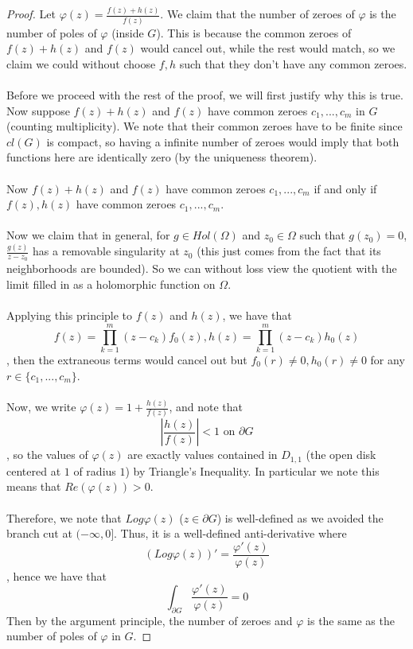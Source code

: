 \begin{proof}
Let $\varphi(z) = \frac{f(z) + h(z)}{f(z)}$. We claim that the number of zeroes of $\varphi$ is the number of poles of $\varphi$ (inside $G$). This is because the common zeroes of $f(z) + h(z)$ and $f(z)$ would cancel out, while the rest would match, so we claim we could without choose $f, h$ such that they don't have any common zeroes.\\\\
Before we proceed with the rest of the proof, we will first justify why this is true. 
Now suppose $f(z) + h(z)$ and $f(z)$ have common zeroes $c_1, ..., c_m$ in $G$ (counting multiplicity). We note that their common zeroes have to be finite since $cl(G)$ is compact, so having a infinite number of zeroes would imply that both functions here are identically zero (by the uniqueness theorem).\\\\
Now $f(z) + h(z)$ and $f(z)$ have common zeroes $c_1, ..., c_m$ if and only if $f(z), h(z)$ have common zeroes $c_1, ..., c_m$.\\\\
Now we claim that in general, for $g \in Hol(\Omega)$ and $z_0 \in \Omega$ such that $g(z_0) = 0$, $\frac{g(z)}{z - z_0}$ has a removable singularity at $z_0$ (this just comes from the fact that its neighborhoods are bounded). So we can without loss view the quotient with the limit filled in as a holomorphic function on $\Omega$.\\\\
Applying this principle to $f(z)$ and $h(z)$, we have that
\[f(z) = \prod_{k = 1}^m (z - c_k) f_0(z), h(z) = \prod_{k = 1}^m (z - c_k) h_0(z)\]
, then the extraneous terms would cancel out but $f_0(r) \neq 0, h_0(r) \neq 0$ for any $r \in \{c_1, ..., c_m\}$.\\\\
Now, we write $\varphi(z) = 1 + \frac{h(z)}{f(z)}$, and note that
\[|\frac{h(z)}{f(z)}| < 1 \text{ on $\partial G$}\]
, so the values of $\varphi(z)$ are exactly values contained in $D_{1, 1}$ (the open disk centered at $1$ of radius $1$) by Triangle's Inequality. In particular we note this means that $Re(\varphi(z)) > 0$.\\\\
Therefore, we note that $Log \varphi(z)$ ($z \in \partial G$) is well-defined as we avoided the branch cut at $(-\infty, 0]$. Thus, it is a well-defined anti-derivative where
\[(Log \varphi(z))' = \frac{\varphi'(z)}{\varphi(z)}\]
, hence we have that
\[\int_{\partial G} \frac{\varphi'(z)}{\varphi(z)} = 0\]
Then by the argument principle, the number of zeroes and $\varphi$ is the same as the number of poles of $\varphi$ in $G$.
\end{proof}

